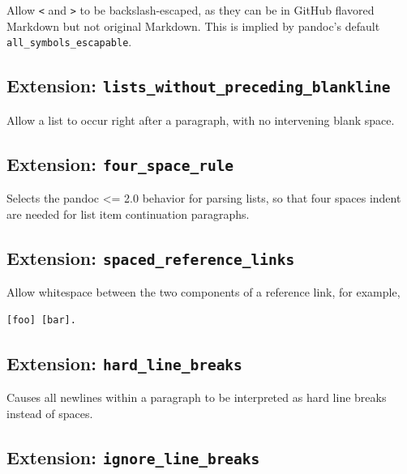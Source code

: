 \documentclass[
  b5paper
]{book}
\begin{document}
Allow \texttt{\textless{}} and \texttt{\textgreater{}} to be
backslash-escaped, as they can be in GitHub flavored Markdown but not
original Markdown. This is implied by pandoc's default
\texttt{all\_symbols\_escapable}.

\subsection{\texorpdfstring{Extension:
\texttt{lists\_without\_preceding\_blankline}}{Extension: lists\_without\_preceding\_blankline}}\label{extension-lists_without_preceding_blankline}

Allow a list to occur right after a paragraph, with no intervening blank
space.

\subsection{\texorpdfstring{Extension:
\texttt{four\_space\_rule}}{Extension: four\_space\_rule}}\label{extension-four_space_rule}

Selects the pandoc \textless= 2.0 behavior for parsing lists, so that
four spaces indent are needed for list item continuation paragraphs.

\subsection{\texorpdfstring{Extension:
\texttt{spaced\_reference\_links}}{Extension: spaced\_reference\_links}}\label{extension-spaced_reference_links}

Allow whitespace between the two components of a reference link, for
example,

\begin{verbatim}
[foo] [bar].
\end{verbatim}

\subsection{\texorpdfstring{Extension:
\texttt{hard\_line\_breaks}}{Extension: hard\_line\_breaks}}\label{extension-hard_line_breaks}

Causes all newlines within a paragraph to be interpreted as hard line
breaks instead of spaces.

\subsection{\texorpdfstring{Extension:
\texttt{ignore\_line\_breaks}}{Extension: ignore\_line\_breaks}}\label{extension-ignore_line_breaks}
\end{document}
